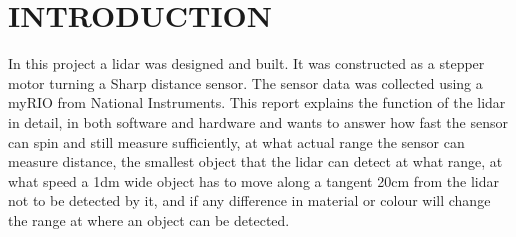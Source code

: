 \section{INTRODUCTION}

In this project a lidar was designed and built. It was constructed as a stepper motor turning a Sharp distance sensor. The sensor data was collected using a myRIO from National Instruments. This report explains the function of the lidar in detail, in both software and hardware and wants to answer how fast the sensor can spin and still measure sufficiently, at what actual range the sensor can measure distance, the smallest object that the lidar can detect at what range, at what speed a 1dm wide object has to move along a tangent 20cm from the lidar not to be detected by it, and if any difference in material or colour will change the range at where an object can be detected. 